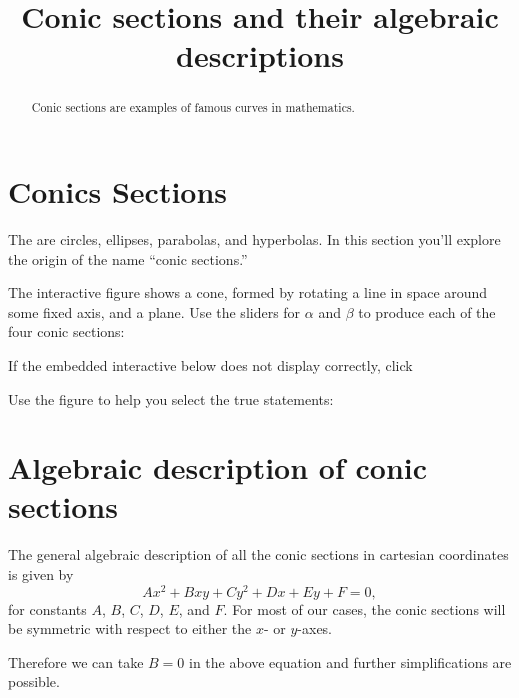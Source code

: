 \documentclass{ximera}
\title[Refresh:]{Conic sections and their algebraic descriptions}
\begin{document}
\begin{abstract}
  Conic sections are examples of famous curves in mathematics.
\end{abstract}
\maketitle

\section{Conics Sections}
The  are circles, ellipses, parabolas, and
hyperbolas.  In this section you'll explore the origin of the name
``conic sections.''

The interactive figure shows a cone, formed by rotating a line in
space around some fixed axis, and a plane.  Use the sliders for
$\alpha$ and $\beta$ to produce each of the four conic sections:

If the embedded interactive below does not display correctly, click 


\begin{problem}
  Use the figure to help you select the true statements:
  \begin{selectAll}
  \end{selectAll}
\end{problem}

\section{Algebraic description of conic sections}
The general algebraic description of all the conic sections in cartesian coordinates is given by
\[
  Ax^2 + Bxy + Cy^2 + Dx + Ey + F = 0,
\]
for constants $A$, $B$, $C$, $D$, $E$, and $F$.
For most of our cases, the conic sections will be symmetric with respect to either the $x$- or $y$-axes.

Therefore we can take $B = 0$ in the above equation and further
simplifications are possible.
\end{document}
